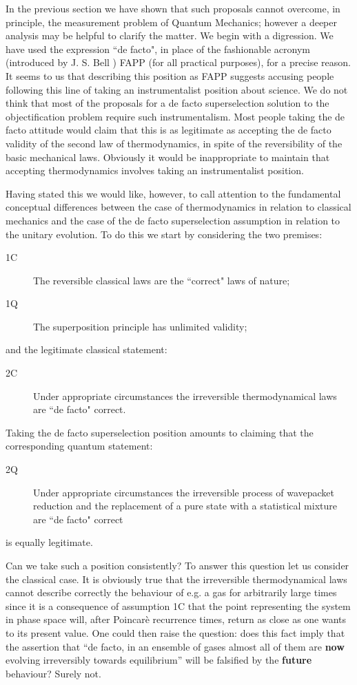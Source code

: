 \documentclass[12pt]{article}
\begin{document}
In the previous section we have shown that such proposals cannot
overcome, in principle, the measurement problem of Quantum
Mechanics; however  a deeper analysis may be helpful to clarify
the matter. We begin with a digression. We have used the
expression ``de facto", in place of the fashionable acronym
(introduced by J. S. Bell \cite{bellam}) FAPP (for all practical
purposes), for a precise reason. It seems to us that describing
this position as FAPP suggests accusing people following this line
of taking an instrumentalist position about science. We do not
think that most of the proposals for a de facto superselection
solution to the objectification problem require such
instrumentalism. Most people taking the de facto attitude would
claim that this is as legitimate as accepting the de facto
validity of the second law of thermodynamics, in spite of the
reversibility of the basic mechanical laws. Obviously it would be
inappropriate to maintain that accepting thermodynamics involves
taking an instrumentalist position.

Having stated this we would like, however, to call attention to
the fundamental conceptual differences between the case of
thermodynamics in relation to classical mechanics and the case of
the de facto superselection assumption in relation to the unitary
evolution. To do this we start by considering the two premises:
\begin{description}
\item[1C] The reversible classical laws are the ``correct" laws
of nature;
\item[1Q] The superposition principle has unlimited validity;
\end{description}
and the legitimate classical statement:
\begin{description}
\item[2C] Under appropriate circumstances the irreversible
thermodynamical laws are ``de facto" correct.
\end{description}
Taking the de facto superselection position amounts to claiming
that the corresponding quantum statement:
\begin{description}
\item[2Q] Under appropriate circumstances the irreversible
process of wavepacket reduction and the replacement of a pure
state with a statistical mixture are ``de facto" correct
\end{description}
is equally legitimate.

Can we take such a position consistently? To answer this question
let us consider the classical case. It is obviously true that the
irreversible thermodynamical laws cannot describe correctly the
behaviour of e.g. a gas for arbitrarily large times since it is a
consequence of assumption 1C that the point representing the
system in phase space will, after Poincar\`e recurrence times,
return as close as one wants to its present value. One could then
raise the question: does this fact imply that the assertion that
``de facto, in an ensemble of gases almost all of them are {\bf
now} evolving irreversibly towards equilibrium'' will be falsified
by the {\bf future} behaviour? Surely not.
\end{document}
